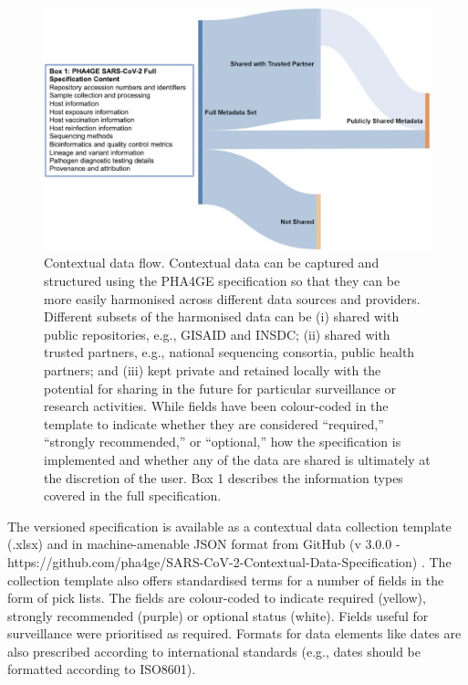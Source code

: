 \begin{figure}[h!]
\centering
\includegraphics[width=\textwidth]{figures/chapter 7/giac003fig1.jpeg}
\caption{Contextual data flow. Contextual data can be captured and structured using the PHA4GE specification so that they can be more easily harmonised across different data sources and providers. Different subsets of the harmonised data can be (i) shared with public repositories, e.g., GISAID and INSDC; (ii) shared with trusted partners, e.g., national sequencing consortia, public health partners; and (iii) kept private and retained locally with the potential for sharing in the future for particular surveillance or research activities. While fields have been colour-coded in the template to indicate whether they are considered “required,” “strongly recommended,” or “optional,” how the specification is implemented and whether any of the data are shared is ultimately at the discretion of the user. Box 1 describes the information types covered in the full specification.}
\label{fig:chap7_figure_1}
\end{figure}

The versioned specification is available as a contextual data collection template (.xlsx) and in machine-amenable JSON format from GitHub (v 3.0.0 - https://github.com/pha4ge/SARS-CoV-2-Contextual-Data-Specification) \cite{public_health_alliance_for_genomic_epidemiology_sars-cov-2-contextual-data-specification_nodate}. The collection template also offers standardised terms for a number of fields in the form of pick lists. The fields are colour-coded to indicate required (yellow), strongly recommended (purple) or optional status (white). Fields useful for surveillance were prioritised as required. Formats for data elements like dates are also prescribed according to international standards (e.g., dates should be formatted according to ISO8601).

